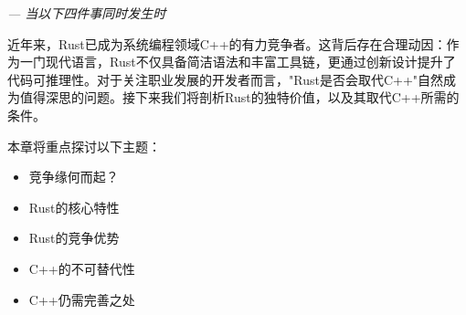 
\begin{flushright}
\textit{--- 当以下四件事同时发生时}
\end{flushright}

近年来，Rust已成为系统编程领域C++的有力竞争者。这背后存在合理动因：作为一门现代语言，Rust不仅具备简洁语法和丰富工具链，更通过创新设计提升了代码可推理性。对于关注职业发展的开发者而言，"Rust是否会取代C++"自然成为值得深思的问题。接下来我们将剖析Rust的独特价值，以及其取代C++所需的条件。

本章将重点探讨以下主题：

\begin{itemize}
\item 
竞争缘何而起？

\item 
Rust的核心特性

\item 
Rust的竞争优势

\item 
C++的不可替代性

\item 
C++仍需完善之处
\end{itemize}